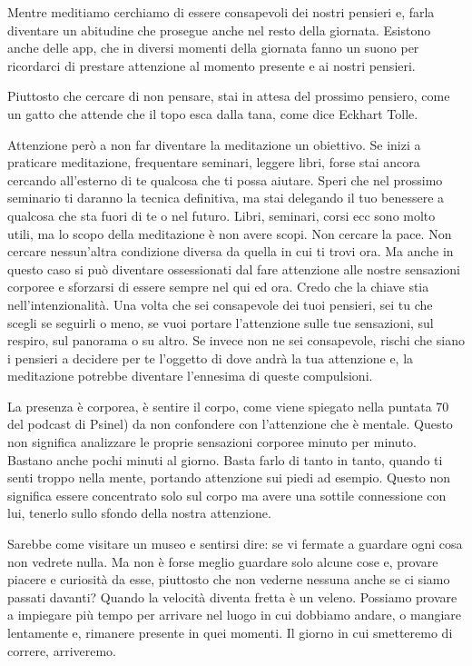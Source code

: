 \documentclass[12pt]{book} %
\begin{document}
Mentre meditiamo cerchiamo di
essere consapevoli dei nostri pensieri e, farla diventare un abitudine che prosegue anche nel resto della giornata.
Esistono anche delle app, che in diversi momenti della giornata fanno un suono per ricordarci di prestare
attenzione al momento presente e ai nostri pensieri. 

Piuttosto che cercare di non pensare, stai in attesa del prossimo pensiero, come un gatto che attende che il topo esca dalla tana, come dice Eckhart Tolle.

Attenzione però a non far diventare la meditazione un obiettivo. Se inizi a praticare meditazione, frequentare seminari,
leggere libri, forse stai ancora cercando all'esterno di te qualcosa che ti
possa aiutare. Speri che nel prossimo seminario ti daranno la tecnica definitiva, ma stai delegando il tuo benessere a
qualcosa che sta fuori di te o nel futuro. Libri, seminari, corsi ecc sono molto utili, ma lo
scopo della meditazione è non avere scopi. Non cercare la pace. Non cercare nessun'altra
condizione diversa da quella in cui ti trovi ora. Ma anche in questo caso si può diventare ossessionati dal fare
attenzione alle nostre sensazioni corporee e sforzarsi di essere sempre nel qui ed ora. 
Credo che la chiave stia nell'intenzionalità. Una volta che sei
consapevole dei tuoi pensieri, sei tu che scegli se seguirli o meno, se vuoi portare l'attenzione
sulle tue sensazioni, sul respiro, sul panorama o su altro. Se invece non ne sei consapevole, rischi che siano i pensieri a
decidere per te l'oggetto di dove andrà la tua attenzione e, la meditazione potrebbe diventare l'ennesima di queste compulsioni.

La presenza è corporea, è sentire il corpo, come viene spiegato nella puntata
70 del podcast di Psinel) da non confondere con l'attenzione che è mentale. Questo non significa analizzare le proprie sensazioni corporee minuto
per minuto. Bastano anche pochi minuti al giorno. Basta farlo di tanto in tanto, quando ti senti troppo nella mente,
portando attenzione sui piedi ad esempio. Questo non significa essere concentrato solo sul corpo ma
avere una sottile connessione con lui, tenerlo sullo sfondo della nostra attenzione.

Sarebbe come visitare un museo e sentirsi dire: se vi fermate a guardare ogni cosa non vedrete nulla. Ma non è forse
meglio guardare solo alcune cose e, provare piacere e curiosità da esse, piuttosto che non vederne nessuna anche se ci
siamo passati davanti? Quando la velocità diventa fretta è un veleno. Possiamo provare a impiegare più tempo per
arrivare nel luogo in cui dobbiamo andare, o mangiare lentamente e, rimanere presente in quei momenti. Il giorno in cui
smetteremo di correre, arriveremo.
\end{document}
